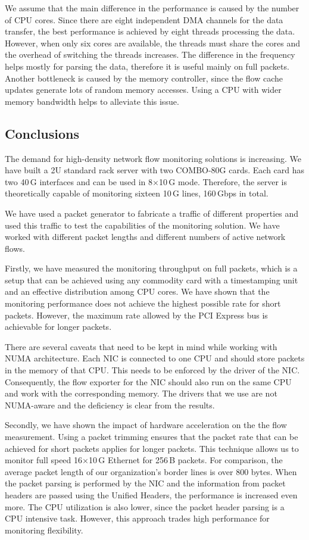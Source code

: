 We assume that the main difference in the performance is caused by the number of CPU cores. Since there are eight independent DMA channels for the data transfer, the best performance is achieved by eight threads processing the data. However, when only six cores are available, the threads must share the cores and the overhead of switching the threads increases. The difference in the frequency helps mostly for parsing the data, therefore it is useful mainly on full packets. Another bottleneck is caused by the memory controller, since the flow cache updates generate lots of random memory accesses. Using a CPU with wider memory bandwidth helps to alleviate this issue.

\subsection{Conclusions} \label{subsec:high-density-conclusions}

The demand for high-density network flow monitoring solutions is increasing. We have built a 2U standard rack server with two COMBO-80G cards. Each card has two 40\,G interfaces and can be used in 8$\times$10\,G mode. Therefore, the server is theoretically capable of monitoring sixteen 10\,G lines, 160\,Gbps in total.

We have used a packet generator to fabricate a traffic of different properties and used this traffic to test the capabilities of the monitoring solution. We have worked with different packet lengths and different numbers of active network flows.

Firstly, we have measured the monitoring throughput on full packets, which is a setup that can be achieved using any commodity card with a timestamping unit and an effective distribution among CPU cores. We have shown that the monitoring performance does not achieve the highest possible rate for short packets. However, the maximum rate allowed by the PCI Express bus is achievable for longer packets.

There are several caveats that need to be kept in mind while working with NUMA architecture. Each NIC is connected to one CPU and should store packets in the memory of that CPU. This needs to be enforced by the driver of the NIC. Consequently, the flow exporter for the NIC should also run on the same CPU and work with the corresponding memory. The drivers that we use are not NUMA-aware and the deficiency is clear from the results.

Secondly, we have shown the impact of hardware acceleration on the the flow measurement. Using a packet trimming ensures that the packet rate that can be achieved for short packets applies for longer packets. This technique allows us to monitor full speed 16$\times$10\,G Ethernet for 256\,B packets. For comparison, the average packet length of our organization's border lines is over 800 bytes. When the packet parsing is performed by the NIC and the information from packet headers are passed using the Unified Headers, the performance is increased even more. The CPU utilization is also lower, since the packet header parsing is a CPU intensive task. However, this approach trades high performance for monitoring flexibility.

